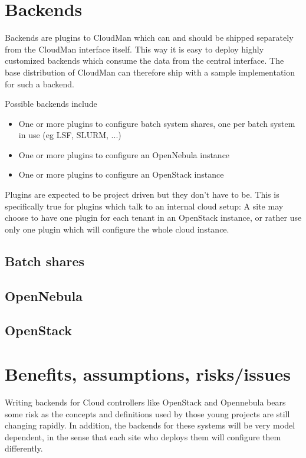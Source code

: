 \documentclass[12pt]{article}
\begin{document}
\section{Backends}
Backends are plugins to CloudMan which can and should be shipped separately from the CloudMan interface itself. This way it is easy to deploy highly customized backends which consume the data from the central interface. The base distribution 
of CloudMan can therefore ship with a sample implementation for such a backend. 

Possible backends include 
\begin{itemize}
\item One or more plugins to configure batch system shares, one per batch system in use (eg LSF, SLURM, ...)
\item One or more plugins to configure an OpenNebula instance
\item One or more plugins to configure an OpenStack instance
\end{itemize}
Plugins are expected to be project driven but they don't have to be. This is specifically true for plugins which talk to
an internal cloud setup: A site may choose to have one plugin for each tenant in an OpenStack instance, or rather use
only one plugin which will configure the whole cloud instance. 

\subsection{Batch shares}

\subsection{OpenNebula}

\subsection{OpenStack}



\section{Benefits, assumptions, risks/issues}
Writing backends for Cloud controllers like OpenStack and Opennebula bears some risk as the concepts and definitions used by those young projects are still changing rapidly. In addition, the backends for these systems will be very model dependent, in the sense that each site who deploys them will configure them differently. 

 

%
%
\begin{thebibliography}{99}

\end{thebibliography}
\end{document}
